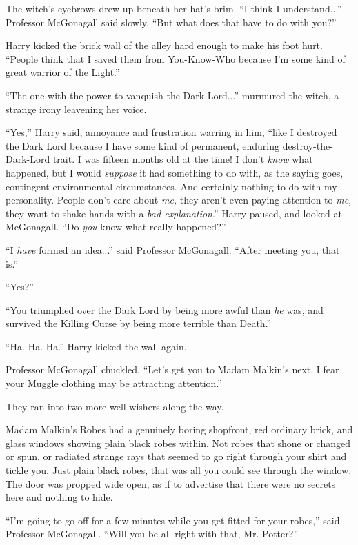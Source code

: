 The witch's eyebrows drew up beneath her hat's brim. ``I think I understand...'' Professor McGonagall said slowly. ``But what does that have to do with you?''

Harry kicked the brick wall of the alley hard enough to make his foot hurt. ``People think that I saved them from You-Know-Who because I'm some kind of great warrior of the Light.''

``The one with the power to vanquish the Dark Lord...'' murmured the witch, a strange irony leavening her voice.

``Yes,'' Harry said, annoyance and frustration warring in him, ``like I destroyed the Dark Lord because I have some kind of permanent, enduring destroy-the-Dark-Lord trait. I was fifteen months old at the time! I don't \emph{know} what happened, but I would \emph{suppose} it had something to do with, as the saying goes, contingent environmental circumstances. And certainly nothing to do with my personality. People don't care about \emph{me,} they aren't even paying attention to \emph{me,} they want to shake hands with a \emph{bad explanation}.'' Harry paused, and looked at McGonagall. ``Do \emph{you} know what really happened?''

``I \emph{have} formed an idea...'' said Professor McGonagall. ``After meeting you, that is.''

``Yes?''

``You triumphed over the Dark Lord by being more awful than \emph{he} was, and survived the Killing Curse by being more terrible than Death.''

``Ha. Ha. Ha.'' Harry kicked the wall again.

Professor McGonagall chuckled. ``Let's get you to Madam Malkin's next. I fear your Muggle clothing may be attracting attention.''

They ran into two more well-wishers along the way.

Madam Malkin's Robes had a genuinely boring shopfront, red ordinary brick, and glass windows showing plain black robes within. Not robes that shone or changed or spun, or radiated strange rays that seemed to go right through your shirt and tickle you. Just plain black robes, that was all you could see through the window. The door was propped wide open, as if to advertise that there were no secrets here and nothing to hide.

``I'm going to go off for a few minutes while you get fitted for your robes,'' said Professor McGonagall. ``Will you be all right with that, Mr. Potter?''

